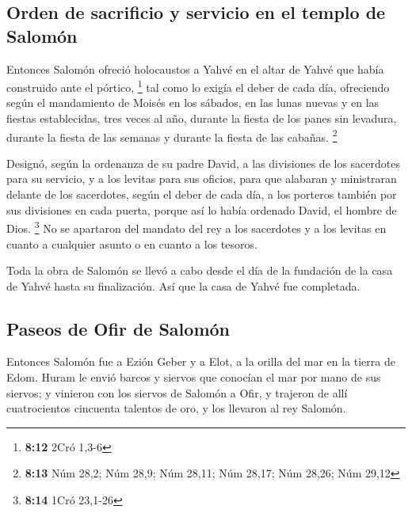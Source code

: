 \begin{paracol}{2}
\hypertarget{orden-de-sacrificio-y-servicio-en-el-templo-de-salomuxf3n}{%
\subsection{Orden de sacrificio y servicio en el templo de
Salomón}\label{orden-de-sacrificio-y-servicio-en-el-templo-de-salomuxf3n}}

 Entonces Salomón ofreció holocaustos a Yahvé en el altar
de Yahvé que había construido ante el pórtico, \footnote{\textbf{8:12}
  2Cró 1,3-6}  tal como lo exigía el deber de cada día,
ofreciendo según el mandamiento de Moisés en los sábados, en las lunas
nuevas y en las fiestas establecidas, tres veces al año, durante la
fiesta de los panes sin levadura, durante la fiesta de las semanas y
durante la fiesta de las cabañas. \footnote{\textbf{8:13} Núm 28,2; Núm
  28,9; Núm 28,11; Núm 28,17; Núm 28,26; Núm 29,12}

 Designó, según la ordenanza de su padre David, a las
divisiones de los sacerdotes para su servicio, y a los levitas para sus
oficios, para que alabaran y ministraran delante de los sacerdotes,
según el deber de cada día, a los porteros también por sus divisiones en
cada puerta, porque así lo había ordenado David, el hombre de Dios.
\footnote{\textbf{8:14} 1Cró 23,1-26}  No se apartaron
del mandato del rey a los sacerdotes y a los levitas en cuanto a
cualquier asunto o en cuanto a los tesoros.

 Toda la obra de Salomón se llevó a cabo desde el día de
la fundación de la casa de Yahvé hasta su finalización. Así que la casa
de Yahvé fue completada.

\hypertarget{paseos-de-ofir-de-salomuxf3n}{%
\subsection{Paseos de Ofir de
Salomón}\label{paseos-de-ofir-de-salomuxf3n}}

 Entonces Salomón fue a Ezión Geber y a Elot, a la orilla
del mar en la tierra de Edom.  Huram le envió barcos y
siervos que conocían el mar por mano de sus siervos; y vinieron con los
siervos de Salomón a Ofir, y trajeron de allí cuatrocientos cincuenta
talentos de oro, y los llevaron al rey Salomón.

\switchcolumn
\begin{otherlanguage}{english}

\hypertarget{section-15}{%
}
\end{otherlanguage}
\end{paracol}
